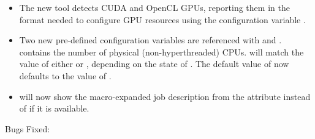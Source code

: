 \begin{itemize}
\item The new  tool detects CUDA and OpenCL GPUs,
reporting them in the format needed to configure GPU resources 
using the configuration variable
.

\item Two new pre-defined configuration variables are referenced with
 and .
 contains the number of 
physical (non-hyperthreaded) CPUs. 
 will match the value of
either  or , 
depending on the state of .
The default value of  now defaults to the value
of .

\item {} will now show the macro-expanded job description from the attribute
 instead of  if it is available.

\end{itemize}

\noindent Bugs Fixed:

